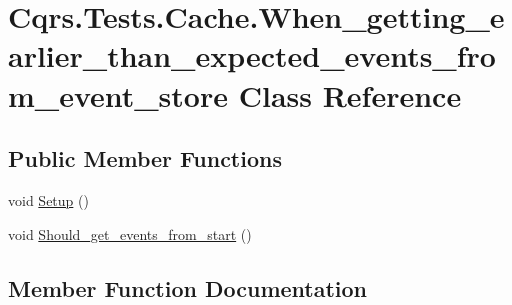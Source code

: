 \hypertarget{classCqrs_1_1Tests_1_1Cache_1_1When__getting__earlier__than__expected__events__from__event__store}{}\section{Cqrs.\+Tests.\+Cache.\+When\+\_\+getting\+\_\+earlier\+\_\+than\+\_\+expected\+\_\+events\+\_\+from\+\_\+event\+\_\+store Class Reference}
\label{classCqrs_1_1Tests_1_1Cache_1_1When__getting__earlier__than__expected__events__from__event__store}
\subsection*{Public Member Functions}
\begin{DoxyCompactItemize}
\item 
void \hyperlink{classCqrs_1_1Tests_1_1Cache_1_1When__getting__earlier__than__expected__events__from__event__store_ab095ffc0bb04e65b5aa2c08acb56c4f6}{Setup} ()
\item 
void \hyperlink{classCqrs_1_1Tests_1_1Cache_1_1When__getting__earlier__than__expected__events__from__event__store_a906e06ee908a7ba5220b2986e34fac27}{Should\+\_\+get\+\_\+events\+\_\+from\+\_\+start} ()
\end{DoxyCompactItemize}


\subsection{Member Function Documentation}
\mbox{\label{classCqrs_1_1Tests_1_1Cache_1_1When__getting__earlier__than__expected__events__from__event__store_ab095ffc0bb04e65b5aa2c08acb56c4f6}} 
